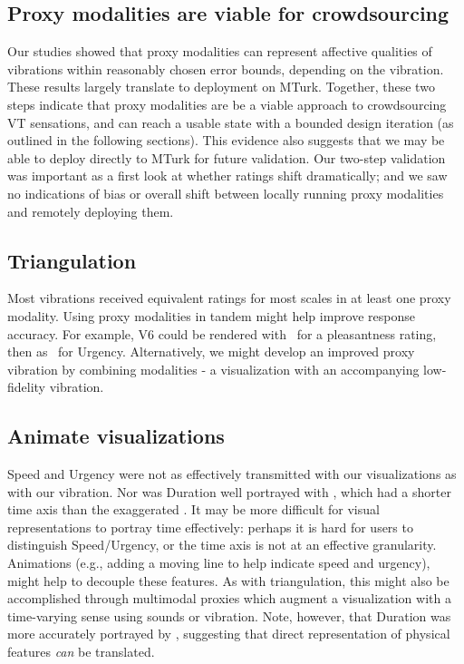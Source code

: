     \subsection{Proxy modalities are viable for crowdsourcing } %
   Our studies showed that proxy modalities can represent %
   affective qualities of vibrations within reasonably chosen error bounds, depending on the vibration.
   These results largely translate to deployment on MTurk.
   Together, these two steps indicate that proxy modalities are be a viable approach to crowdsourcing VT sensations, and can reach a usable state with a bounded design iteration (as outlined in the following sections).
   This evidence also suggests that we may be able to deploy directly to MTurk for future validation.
   Our two-step validation was important as a first look at whether ratings shift dramatically; and we saw no indications of bias or overall shift between locally running proxy modalities and remotely deploying them.
   \vspace{0.35in}
    \subsection{Triangulation }
	Most vibrations received equivalent ratings for most scales in at least one proxy modality.
	Using proxy modalities in tandem might help improve response accuracy.
	For example, V6 could be rendered with \lofi~for a pleasantness rating, then as \linear~for Urgency.
	Alternatively, we might develop an improved proxy vibration by combining modalities - a visualization with an accompanying low-fidelity vibration.
	

    \subsection{Animate visualizations }
    Speed and Urgency were not as effectively transmitted with our visualizations as with our vibration.
    Nor was Duration well portrayed with  \original, which had a shorter time axis than the exaggerated \linear.
    It may be more difficult for visual representations to portray time effectively: perhaps it is hard for users to distinguish Speed/Urgency, or the time axis is not at an effective granularity.
    Animations (e.g., adding a moving line to help indicate speed and urgency), might help to decouple these features.
    As with triangulation, this might also be accomplished through multimodal proxies which augment a visualization with a time-varying sense using sounds or vibration.
    Note, however, that Duration was more accurately portrayed by \linear, suggesting that direct representation of physical features \textit{can} be translated.
    
